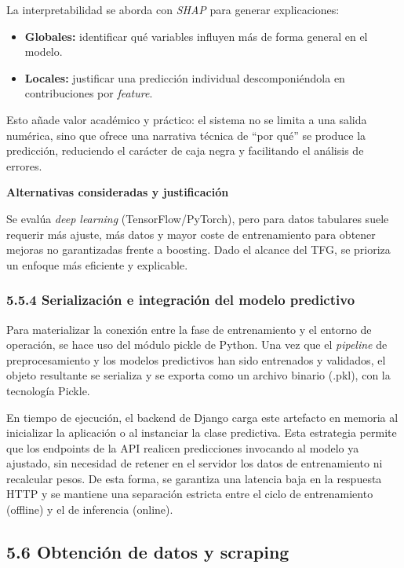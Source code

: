 La interpretabilidad se aborda con \textit{SHAP} para generar explicaciones:

\begin{itemize}
\item \textbf{Globales:} identificar qué variables influyen más de forma general en el modelo.
\item \textbf{Locales:} justificar una predicción individual descomponiéndola en contribuciones por 
\textit{feature}.
\end{itemize}

Esto añade valor académico y práctico: el sistema no se limita a una salida numérica, sino que ofrece 
una narrativa técnica de ``por qué'' se produce la predicción, reduciendo el carácter de caja negra y 
facilitando el análisis de errores.

\textbf{Alternativas consideradas y justificación}

Se evalúa \textit{deep learning} (TensorFlow/PyTorch), pero para datos tabulares suele 
requerir más ajuste, más datos y mayor coste de entrenamiento para obtener mejoras 
no garantizadas frente a boosting. Dado el alcance del TFG, se prioriza un enfoque 
más eficiente y explicable.

\subsubsection{5.5.4 Serialización e integración del modelo predictivo}

Para materializar la conexión entre la fase de entrenamiento y el entorno de 
operación, se hace uso del módulo pickle de Python. Una vez que el \textit{pipeline} de 
preprocesamiento y los modelos predictivos han sido entrenados y validados, el 
objeto resultante se serializa y se exporta como un archivo binario (.pkl), con la tecnología Pickle.

En tiempo de ejecución, el backend de Django carga este artefacto en memoria al 
inicializar la aplicación o al instanciar la clase predictiva. Esta estrategia 
permite que los endpoints de la API realicen predicciones invocando al modelo ya 
ajustado, sin necesidad de retener en el servidor los datos de entrenamiento ni 
recalcular pesos. De esta forma, se garantiza una latencia baja en la respuesta 
HTTP y se mantiene una separación estricta entre el ciclo de entrenamiento 
(offline) y el de inferencia (online).

\subsection{5.6 Obtención de datos y scraping}

